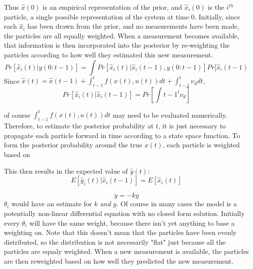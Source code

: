 \documentclass{article}
\begin{document}
Thus $\hat{x}(0)$ is an empirical representation of the prior, and $\hat{x}_i(0)$
is the $i^{th}$ particle, a single possible representation of the system at time 0.
Initially, since each $\hat{x}_i$ has been drawn from the prior, and no measurements
have been made, the particles are all equally weighted. When a measurement becomes
available, that information is then incorporated into the posterior by re-weighting
the particles according to how well they estimated this new measurement. 
\begin{equation}
Pr[\hat{x}_i(t) | y(0:t-1)] = \int Pr[\hat{x}_i(t) | \hat{x}_i(t-1), y(0:t-1)]Pr[\hat{x}_i(t-1)
\end{equation}
Since $\hat{x}(t) = \hat{x}(t-1) + \int_{t-1}^t f(x(t), u(t))dt + \int_{t-1}^t\nu_d dt$, 
\begin{equation}
Pr[\hat{x}_i(t) | \hat{x}_i(t-1)] = Pr[\int{t-1}^t \nu_d]
\end{equation}

of course $\int_{t-1}^t f(x(t), u(t))dt$ may need to be evaluated numerically. Therefore,
to estimate the posterior probability at $t$, it is just necessary to propagate
each particle forward in time according to a state space function. To form 
the posterior probability around the true $x(t)$, each particle is weighted
based on 



This
then results in the expected value of $\hat{y}(t)$:
\begin{equation}
E[\hat{y}_i(t) | \hat{x}_i(t-1)] = E[\hat{x}_i(t)]
\end{equation}

\begin{equation}
\dot{y} = -ky
\end{equation}
$\theta_i$ would have an estimate for $k$ \emph{and} $y$. Of course in many cases
the model is a potentially non-linear differential equation with no closed
form solution. Initially every $\theta_i$ will have the same weight, because
there isn't yet anything to base a weighting on. Note that this doesn't mean
that the particles have been evenly distributed, so the distribution is not 
necessarily "flat" just because all the particles are equaly weighted. When a
new measurement is available, the particles are then reweighted based on how
well they predicted the new measurement. 
\end{document}
